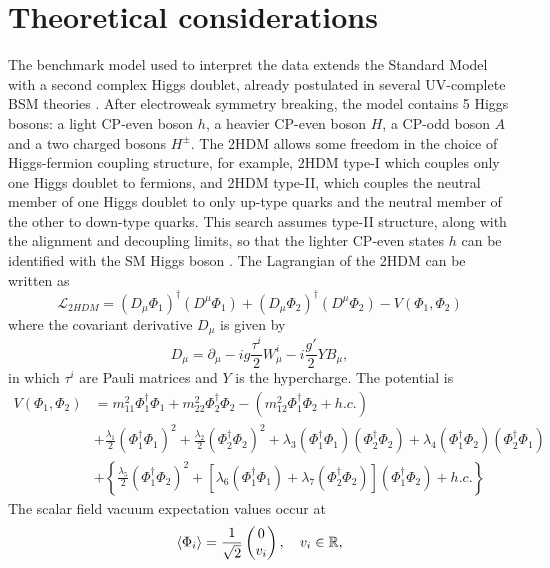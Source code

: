 \section{Theoretical considerations}
\label{sect:theoretical-considerations-2hdma}
The benchmark model used to interpret the data extends the Standard Model with a second complex Higgs doublet, 
already postulated in several UV-complete BSM theories \cite{Buckley:2014fba,Abercrombie:2015wmb}. 
After electroweak symmetry breaking, the model contains 5 Higgs bosons: a light CP-even boson $h$, 
a heavier CP-even boson $H$, a CP-odd boson $A$ and a two charged bosons $H^{\pm}$. 
The 2HDM allows some freedom in the choice of Higgs-fermion coupling structure, for example, 
2HDM type-I which couples only one Higgs doublet to fermions, and 2HDM type-II, 
which couples the neutral member of one Higgs doublet to only up-type quarks and the neutral member of the other to down-type quarks. 
This search assumes type-II structure, along with the alignment and decoupling limits, 
so that the lighter CP-even states $h$ can be identified with the SM Higgs boson \cite{Gunion:2002zf}. 
The Lagrangian of the 2HDM can be written as 
\begin{equation}
    \label{4.1}
    \mathcal{L}_{2HDM} = (D_{\mu}\Phi_1)^{\dag}(D^{\mu}\Phi_1) + (D_{\mu}\Phi_2)^{\dag}(D^{\mu}\Phi_2) - V(\Phi_1, \Phi_2)
\end{equation}
where the covariant derivative $D_{\mu}$ is given by 
$$D_{\mu} = \partial_{\mu} - ig\frac{\tau^i}{2}W^i_{\mu} - i\frac{g'}{2}YB_{\mu},$$
in which $\tau^i$ are Pauli matrices and $Y$ is the hypercharge. The potential is
\begin{equation} \label{4.2}
    \begin{split} 
        V(\Phi_1, \Phi_2)  &= m_{11}^2\Phi_1^{\dag}\Phi_1 + m_{22}^2\Phi_2^{\dag}\Phi_2 - (m_{12}^2 \Phi_1^{\dag}\Phi_2 + h.c.) \\
        &+ \frac{\lambda_1}{2}(\Phi_1^{\dag}\Phi_1)^2 + \frac{\lambda_2}{2}(\Phi_2^{\dag}\Phi_2)^2  
        + \lambda_3(\Phi_1^{\dag}\Phi_1)(\Phi_2^{\dag}\Phi_2) + \lambda_4 (\Phi_1^{\dag}\Phi_2)(\Phi_2^{\dag}\Phi_1) \\ 
        &+ \left\{ \frac{\lambda_5}{2} (\Phi_1^{\dag}\Phi_2)^2 + [\lambda_6(\Phi_1^{\dag}\Phi_1) + \lambda_7(\Phi_2^{\dag}\Phi_2) ](\Phi_1^{\dag}\Phi_2) + h.c. \right\} 
    \end{split}
\end{equation}
The scalar field vacuum expectation values occur at 
\begin{equation}
    \label{4.3}
    \expval{\Phi_i} = \frac{1}{\sqrt{2}}\begin{pmatrix}
        0 \\ v_i
    \end{pmatrix},\quad v_i \in \mathbb{R},
\end{equation}
